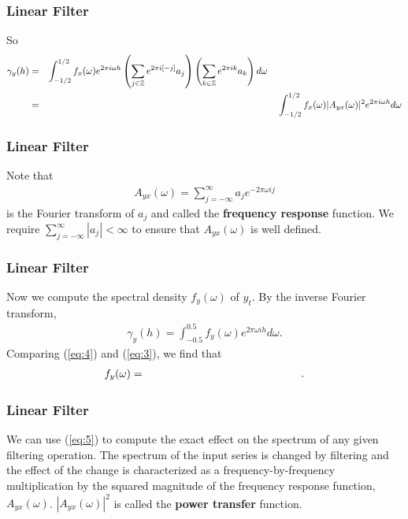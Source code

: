 \documentclass[%
xcolor=pdftex]{beamer}
\begin{document}
\begin{frame}
\frametitle{Linear Filter}

So
\begin{eqnarray} \label{eq:3}
\gamma_y(h) &=& \int_{-1/2}^{1/2} f_x (\omega) e^{2\pi i \omega h }\left(\sum_{j \in \mathbb{Z} } e^{2\pi i[-j]} a_j \right) \left(\sum_{k \in \mathbb{Z} } e^{2\pi ik}a_k \right) d \omega \hspace{50mm} \nonumber \\
            &=& \int_{-1/2}^{1/2} f_x(\omega) |A_{yx}(\omega)|^2  e^{2\pi i \omega h } d\omega  
\end{eqnarray}

\end{frame}



\begin{frame}
\frametitle{Linear Filter}

Note that
\begin{eqnarray} \label{eq:res}
A_{yx}(\omega) = \sum^\infty_{j=-\infty} a_j e^{-2\pi \omega i j}
\end{eqnarray}
is the Fourier transform of $a_j$ and called the {\bf frequency
response} function. We require $\sum^\infty_{j=-\infty}|a_j|<\infty$ to ensure that
$A_{yx}(\omega)$ is well defined.

\end{frame}

\begin{frame}
\frametitle{Linear Filter}

Now we compute the spectral density $f_y(\omega)$ of $y_t$. By
the inverse Fourier transform,
\begin{eqnarray}\label{eq:4}
\gamma_y(h)  = \int^{0.5}_{-0.5} f_y(\omega) e^{2\pi \omega i h}d\omega.
\end{eqnarray}
Comparing (\ref{eq:4}) and (\ref{eq:3}), we find that
\begin{eqnarray}\label{eq:5}
f_y(\omega)  =  \hspace{50mm}.
\end{eqnarray}


\end{frame}

\begin{frame}
\frametitle{Linear Filter}

We can use (\ref{eq:5}) to compute the exact effect on the spectrum of any given filtering operation. The spectrum of the input series is changed by filtering and the effect of the change is characterized as a frequency-by-frequency multiplication by the squared magnitude of the frequency response function, $A_{yx}(\omega)$. $|A_{yx}(\omega)|^2$ is called the \textbf{power transfer} function.

\end{frame}
\end{document}
